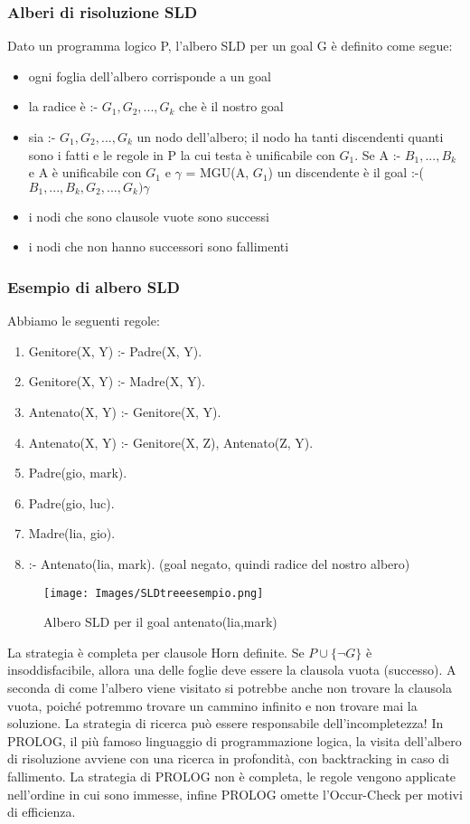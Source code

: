 \documentclass{article}
\begin{document}
\subsubsection{Alberi di risoluzione SLD}
Dato un programma logico P, l’albero SLD per un goal G è definito come segue:
\begin{itemize}
    \item ogni foglia dell'albero corrisponde a un goal
    \item la radice è :- $G_1, G_2, ..., G_k$ che è il nostro goal
    \item sia :- $G_1, G_2, ..., G_k$ un nodo dell'albero; il nodo ha tanti discendenti quanti sono i fatti e le regole in P la cui testa è unificabile con $G_1$. \newline 
    Se A :- $B_1, ..., B_k$ e A è unificabile con $G_1$ e $\gamma$ = MGU(A, $G_1$) \newline 
    un discendente è il goal :-($B_1, ..., B_k, G_2, ..., G_k) \gamma$
    \item i nodi che sono clausole vuote sono successi
    \item i nodi che non hanno successori sono fallimenti
\end{itemize}

\subsubsection{Esempio di albero SLD}
Abbiamo le seguenti regole:
\begin{enumerate}
    \item Genitore(X, Y) :- Padre(X, Y).
    \item Genitore(X, Y) :- Madre(X, Y).
    \item Antenato(X, Y) :- Genitore(X, Y).
    \item Antenato(X, Y) :- Genitore(X, Z), Antenato(Z, Y).
    \item Padre(gio, mark).
    \item Padre(gio, luc).
    \item Madre(lia, gio).
    \item :- Antenato(lia, mark). \quad (goal negato, quindi radice del nostro albero)
\end{enumerate}
\begin{figure}[H]
\centering
\texttt{[image: Images/SLDtreeesempio.png]}
\caption{Albero SLD per il goal antenato(lia,mark)}
\end{figure}
La strategia è completa per clausole Horn definite. Se $P \cup \{\neg G\}$ è insoddisfacibile, allora una delle foglie deve essere la clausola vuota (successo).\newline
A seconda di come l’albero viene visitato si potrebbe anche non trovare la clausola vuota, poiché potremmo trovare un cammino infinito e non trovare mai la soluzione. La strategia di ricerca può essere responsabile dell'incompletezza! In PROLOG, il più famoso linguaggio di programmazione logica, la visita dell'albero di risoluzione avviene con una ricerca in profondità, con backtracking in caso di fallimento. La strategia di PROLOG non è completa, le regole vengono applicate nell'ordine in cui sono immesse, infine PROLOG omette l’Occur-Check per motivi di efficienza.
\end{document}
